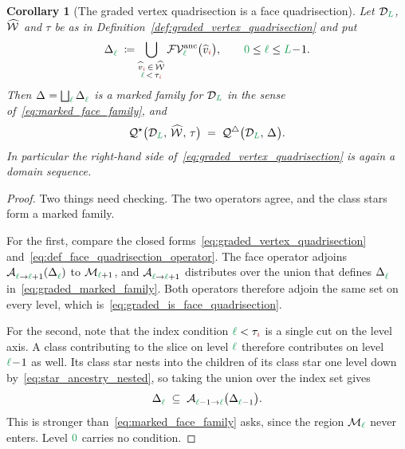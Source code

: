 \documentclass[a4paper, 12pt]{article}
\makeatletter
\newcommand{\quadriF}{\mathcal{Q}^{\triangle}}                   %
\newcommand{\quadriV}{\mathcal{Q}^{\star}}                       %
\newcommand{\quadriVup}[1]{\quadriV_{\rightarrow #1}}            %
\newcommand{\targetlevel}{\tau}                                 %
\newcommand{\green}{\color{ForestGreen}}
\newcommand{\brickred}{\color{BrickRed}}
\newcommand{\V}{\mathcal{V}}
\newcommand{\F}{\mathcal{F}}
\DeclareRobustCommand{\simplexsubsetTwo}[2][]{\Delta\ifx\@empty#1\@empty\else^{#1}\fi_{#2}}
\newcommand{\vertexClass}[1]{\widehat{v}_{#1}}
\DeclareRobustCommand{\markedVertexClasses}[1][]{\widehat{\mathcal{W}}\ifx\@empty#1\@empty\else^{#1}\fi}
\newcommand{\coarseIdxone}{{\brickred i}}
\renewcommand{\l}{{\green\ell}}
\renewcommand{\L}{{\green L}}
\newcommand{\lzero}{{\green 0}}
\newcommand{\Aop}[3]{\mathcal{A}^{#1}_{{#2} \to {#3}}}
\newcommand{\M}{\mathcal{M}}
\newtheorem{corollary}[theorem]{Corollary}
\theoremstyle{definition}
\theoremstyle{plain}
\numberwithin{equation}{section}
\newcommand{\tobecut}[1]{{\color{red} #1}}     %
\DeclareRobustCommand{\domseq}[1][]{\mathcal{D}\ifx\@empty#1\@empty\else_{#1}\fi}
\newcommand{\FVanc}[1]{\F\V^{\mathrm{anc}}_{#1}}            %
\makeatother
\begin{document}
\begin{corollary}[The graded vertex quadrisection is a face quadrisection]
    \label{cor:graded_is_face_quadrisection}
    Let $\domseq[\L]$, $\markedVertexClasses$ and $\targetlevel$ be as in Definition~\ref{def:graded_vertex_quadrisection} and put
    \begin{equation}
        \label{eq:graded_marked_family}
        \simplexsubsetTwo{\l} \; \coloneq \bigcup\limits_{\substack{\vertexClass{\coarseIdxone} \, \in \, \markedVertexClasses \\ \l \, < \, \targetlevel_\coarseIdxone}} \FVanc{\l} \big( \vertexClass{\coarseIdxone} \big), \qquad \lzero \leq \l \leq \L \! - \! 1.
    \end{equation}
    Then $\simplexsubsetTwo{} = \bigsqcup_\l \simplexsubsetTwo{\l}$ is a marked family for $\domseq[\L]$ in the sense of~\eqref{eq:marked_face_family}, and
    \begin{equation}
        \label{eq:graded_is_face_quadrisection}
        \quadriV \big( \domseq[\L], \, \markedVertexClasses, \, \targetlevel \big) \; = \; \quadriF \big( \domseq[\L], \, \simplexsubsetTwo{} \big).
    \end{equation}
    In particular the right-hand side of~\eqref{eq:graded_vertex_quadrisection} is again a domain sequence.
\end{corollary}
\begin{proof}
    Two things need checking. The two operators agree, and the class stars form a marked family.

    For the first, compare the closed forms~\eqref{eq:graded_vertex_quadrisection} and~\eqref{eq:def_face_quadrisection_operator}. The face operator adjoins $\Aop{}{\l}{\l+1}(\simplexsubsetTwo{\l})$ to $\M_{\l+1}$, and $\Aop{}{\l}{\l+1}$ distributes over the union that defines $\simplexsubsetTwo{\l}$ in~\eqref{eq:graded_marked_family}. Both operators therefore adjoin the same set on every level, which is~\eqref{eq:graded_is_face_quadrisection}.

    For the second, note that the index condition $\l < \targetlevel_\coarseIdxone$ is a single cut on the level axis. A class contributing to the slice on level $\l$ therefore contributes on level $\l \! - \! 1$ as well. Its class star nests into the children of its class star one level down by~\eqref{eq:star_ancestry_nested}, so taking the union over the index set gives
    \begin{equation*}
        \simplexsubsetTwo{\l} \; \subseteq \; \Aop{}{\l-1}{\l} \big( \simplexsubsetTwo{\l-1} \big) .
    \end{equation*}
    This is stronger than~\eqref{eq:marked_face_family} asks, since the region $\M_\l$ never enters. Level $\lzero$ carries no condition.
\end{proof}
\end{document}
